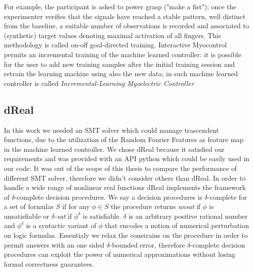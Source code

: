 For example, the participant is asked to power grasp ("make a fist"); once the experimenter verifies that the signals have reached a stable pattern, well distinct from the baseline, a suitable number of observations is recorded and associated to (synthetic) target values denoting maximal activation of all fingers. This methodology is called on-off goal-directed training.
Interactive Myocontrol permits an incremental training of the machine learned controller: it is possible for the user to add new training samples after the initial training session and retrain the learning machine using also the new data; in \cite{Strazzulla2017} such machine learned controller is called \textit{Incremental-Learning Myoelectric Controller}
\subsection{dReal}\label{subsec:dReal}
In this work we needed an SMT solver which could manage trascendent functions, due to the utilization of the Random Fourier Features as feature map in the machine learned controller. We chose dReal \cite{gao2013dreal} because it satisfied our requirements and was provided with an API python which could be easily used in our code. It was out of the scope of this thesis to compare the performance of different SMT solver, therefore we didn't consider others than dReal.
In order to handle a wide range of nonlinear real functions dReal implements the framework of $\delta$-complete decision procedures. We say a decision procedures is $\delta$-complete for a set of formulas $S$ if for any $\phi \in S$ the procedure returns \textit{unsat} if $\phi$ is unsatisfiable or \textit{$\delta$-sat} if $\phi^\delta$ is satisfiable.
$\delta$ is an arbitrary positive rational number and $\phi^\delta$ is a syntactic variant of $\phi$ that encodes a notion of numerical perturbation on logic formulas. Essentialy we relax the constrains on the procedure in order to permit answers with an one sided $\delta$-bounded error, therefore $\delta$-complete decision procedures can exploit the power of numerical approximations without losing formal correctness guarantees.